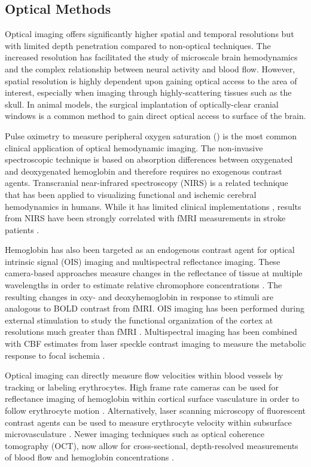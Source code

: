 
\subsection{Optical Methods}
Optical imaging offers significantly higher spatial and temporal resolutions but with limited depth penetration compared to non-optical techniques. The increased resolution has facilitated the study of microscale brain hemodynamics and the complex relationship between neural activity and blood flow. However, spatial resolution is highly dependent upon gaining optical access to the area of interest, especially when imaging through highly-scattering tissues such as the skull. In animal models, the surgical implantation of optically-clear cranial windows is a common method to gain direct optical access to surface of the brain.

Pulse oximetry to measure peripheral oxygen saturation () is the most common clinical application of optical hemodynamic imaging. The non-invasive spectroscopic technique is based on absorption differences between oxygenated and deoxygenated hemoglobin and therefore requires no exogenous contrast agents. Transcranial near-infrared spectroscopy (NIRS) is a related technique that has been applied to visualizing functional \cite{Cui:2011en} and ischemic \cite{Murkin:2009eb} cerebral hemodynamics in humans. While it has limited clinical implementations \cite{Hoshi:2011gr}, results from NIRS have been strongly correlated with fMRI measurements in stroke patients \cite{Kato:2002ka}.

Hemoglobin has also been targeted as an endogenous contrast agent for optical intrinsic signal (OIS) imaging and multispectral reflectance imaging. These camera-based approaches measure changes in the reflectance of tissue at multiple wavelengths in order to estimate relative chromophore concentrations \cite{Zepeda:2004hc}. The resulting changes in oxy- and deoxyhemoglobin in response to stimuli are analogous to BOLD contrast from fMRI. OIS imaging has been performed during external stimulation to study the functional organization of the cortex at resolutions much greater than fMRI \cite{Tso:1990ba, Masino:1993tk}. Multispectral imaging has been combined with CBF estimates from laser speckle contrast imaging to measure the metabolic response to focal ischemia \cite{Jones:2008gb}.

Optical imaging can directly measure flow velocities within blood vessels by tracking or labeling erythrocytes. High frame rate cameras can be used for reflectance imaging of hemoglobin within cortical surface vasculature in order to follow erythrocyte motion \cite{Kazmi:2015du}. Alternatively, laser scanning microscopy of fluorescent contrast agents can be used to measure erythrocyte velocity within subsurface microvasculature \cite{Shih:2012bo}. Newer imaging techniques such as optical coherence tomography (OCT), now allow for cross-sectional, depth-resolved measurements of blood flow and hemoglobin concentrations \cite{Srinivasan:2009vx}.



